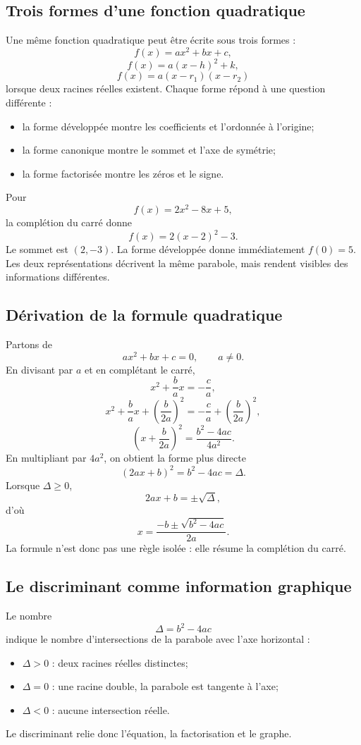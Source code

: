 \documentclass[12pt,a4paper,openany]{book}
\begin{document}
\subsection{Trois formes d'une fonction quadratique}

Une même fonction quadratique peut être écrite sous trois formes :
\[
f(x)=ax^2+bx+c,
\]
\[
f(x)=a(x-h)^2+k,
\]
\[
f(x)=a(x-r_1)(x-r_2)
\]
lorsque deux racines réelles existent. Chaque forme répond à une question différente :
\begin{itemize}
\item la forme développée montre les coefficients et l'ordonnée à l'origine;
\item la forme canonique montre le sommet et l'axe de symétrie;
\item la forme factorisée montre les zéros et le signe.
\end{itemize}

\begin{examplebox}
Pour
\[
f(x)=2x^2-8x+5,
\]
la complétion du carré donne
\[
f(x)=2(x-2)^2-3.
\]
Le sommet est $(2,-3)$. La forme développée donne immédiatement $f(0)=5$. Les deux représentations décrivent la même parabole, mais rendent visibles des informations différentes.
\end{examplebox}

\subsection{Dérivation de la formule quadratique}

Partons de
\[
ax^2+bx+c=0,
\qquad a\neq0.
\]
En divisant par $a$ et en complétant le carré,
\[
x^2+\frac ba x=-\frac ca,
\]
\[
x^2+\frac ba x+\left(\frac b{2a}\right)^2
=
-\frac ca+\left(\frac b{2a}\right)^2,
\]
\[
\left(x+\frac b{2a}\right)^2
=
\frac{b^2-4ac}{4a^2}.
\]
En multipliant par $4a^2$, on obtient la forme plus directe
\[
(2ax+b)^2=b^2-4ac=\Delta.
\]
Lorsque $\Delta\geq0$,
\[
2ax+b=\pm\sqrt\Delta,
\]
d'où
\[
x=\frac{-b\pm\sqrt{b^2-4ac}}{2a}.
\]
La formule n'est donc pas une règle isolée : elle résume la complétion du carré.

\subsection{Le discriminant comme information graphique}

Le nombre
\[
\Delta=b^2-4ac
\]
indique le nombre d'intersections de la parabole avec l'axe horizontal :
\begin{itemize}
\item $\Delta>0$ : deux racines réelles distinctes;
\item $\Delta=0$ : une racine double, la parabole est tangente à l'axe;
\item $\Delta<0$ : aucune intersection réelle.
\end{itemize}
Le discriminant relie donc l'équation, la factorisation et le graphe.
\end{document}
